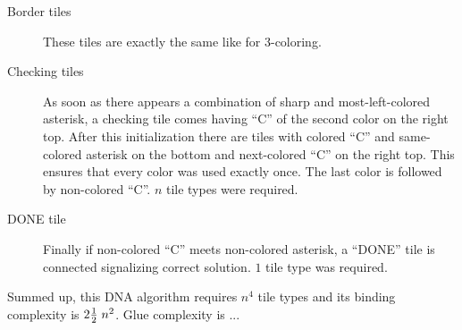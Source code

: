 \begin{description}
\begin{description}
	\end{description}
	\item[Border tiles] These tiles are exactly the same like for 3-coloring.
	\item[Checking tiles] As soon as there appears a combination of sharp and most-left-colored asterisk, a checking tile comes having ``C'' of the second color on the right top. After this initialization there are tiles with colored ``C'' and same-colored asterisk on the bottom and next-colored ``C'' on the right top. This ensures that every color was used exactly once. The last color is followed by non-colored ``C''. $n$ tile types were required.
	\item[DONE tile] Finally if non-colored ``C'' meets non-colored asterisk, a ``DONE'' tile is connected signalizing correct solution. $1$ tile type was required.
\end{description}
Summed up, this DNA algorithm requires $n^4$ tile types and its binding complexity is $2\nicefrac{1}{2}\;n^2$. Glue complexity is ...


